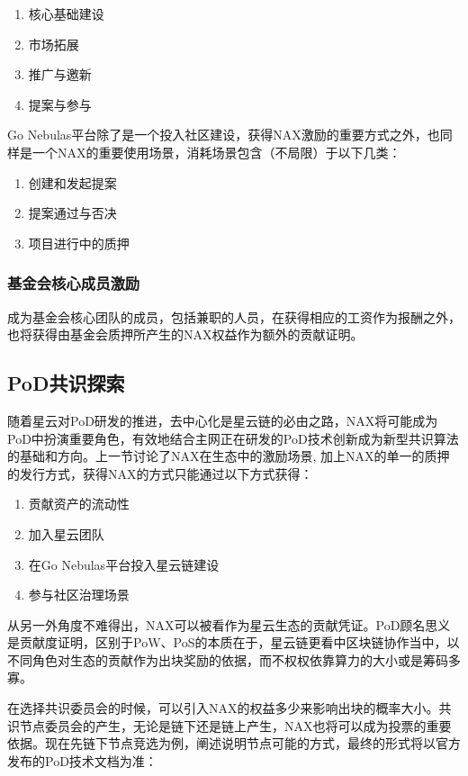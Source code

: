 \begin{enumerate}[\hspace{1cm}(a)]
  \item 核心基础建设
  \item 市场拓展
  \item 推广与邀新
  \item 提案与参与
\end{enumerate}

Go Nebulas平台除了是一个投入社区建设，获得NAX激励的重要方式之外，也同样是一个NAX的重要使用场景，消耗场景包含（不局限）于以下几类：
\begin{enumerate}[\hspace{1cm}(a)]
  \item 创建和发起提案
  \item 提案通过与否决
  \item 项目进行中的质押
\end{enumerate}

\subsubsection{基金会核心成员激励}
成为基金会核心团队的成员，包括兼职的人员，在获得相应的工资作为报酬之外，也将获得由基金会质押所产生的NAX权益作为额外的贡献证明。

\subsection{PoD共识探索}
随着星云对PoD研发的推进，去中心化是星云链的必由之路，NAX将可能成为PoD中扮演重要角色，有效地结合主网正在研发的PoD技术创新成为新型共识算法的基础和方向。上一节讨论了NAX在生态中的激励场景, 加上NAX的单一的质押的发行方式，获得NAX的方式只能通过以下方式获得：
\begin{enumerate}[\hspace{1cm}(i)]
  \item 贡献资产的流动性
  \item 加入星云团队
  \item 在Go Nebulas平台投入星云链建设
  \item 参与社区治理场景
\end{enumerate}

从另一外角度不难得出，NAX可以被看作为星云生态的贡献凭证。PoD顾名思义是贡献度证明，区别于PoW、PoS的本质在于，星云链更看中区块链协作当中，以不同角色对生态的贡献作为出块奖励的依据，而不权权依靠算力的大小或是筹码多寡。

在选择共识委员会的时候，可以引入NAX的权益多少来影响出块的概率大小。共识节点委员会的产生，无论是链下还是链上产生，NAX也将可以成为投票的重要依据。现在先链下节点竞选为例，阐述说明节点可能的方式，最终的形式将以官方发布的PoD技术文档为准：

